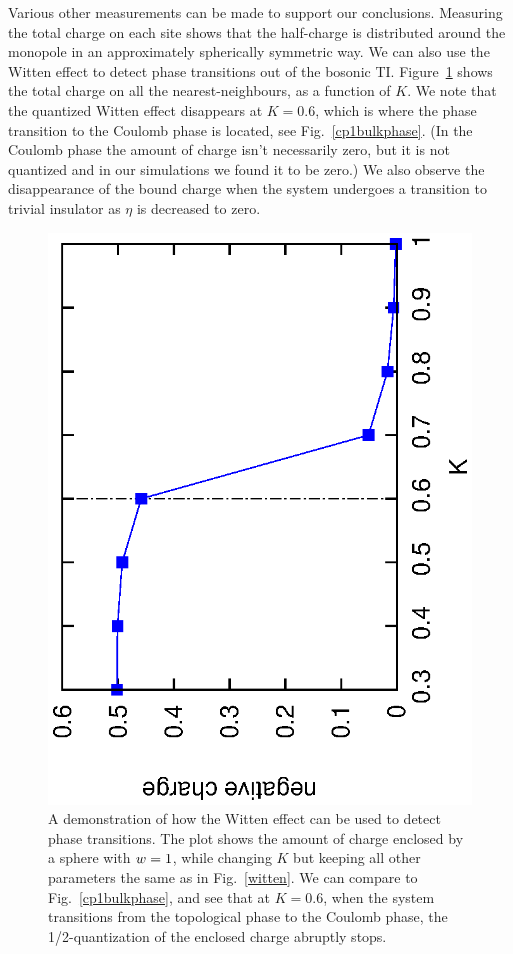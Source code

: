 Various other measurements can be made to support our conclusions. Measuring the total charge on each site shows that the half-charge is distributed around the monopole in an approximately spherically symmetric way. We can also use the Witten effect to detect phase transitions out of the bosonic TI. Figure~\ref{wittenphase} shows the total charge on all the nearest-neighbours, as a function of $K$. We note that the quantized Witten effect disappears at $K=0.6$, which is where the phase transition to the Coulomb phase is located, see Fig.~\ref{cp1bulkphase}. (In the Coulomb phase the amount of charge isn't necessarily zero, but it is not quantized and in our simulations we found it to be zero.) We also observe the disappearance of the bound charge when the system undergoes a transition to trivial insulator as $\eta$ is decreased to zero.


\begin{figure}
\includegraphics[angle=-90,width=\linewidth]{figures/wittenphase.eps}
\caption{A demonstration of how the Witten effect can be used to detect phase transitions. The plot shows the amount of charge enclosed by a sphere with $\scripty{r}=1$, while changing $K$ but keeping all other parameters the same as in Fig.~\ref{witten}. We can compare to Fig.~\ref{cp1bulkphase}, and see that at $K=0.6$, when the system transitions from the topological phase to the Coulomb phase, the 1/2-quantization of the enclosed charge abruptly stops.}
\label{wittenphase}
\end{figure}


